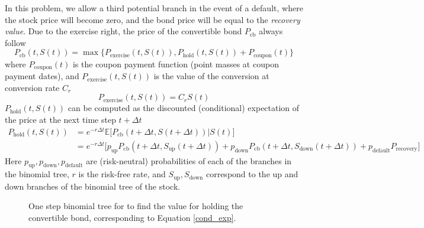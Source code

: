 \documentclass[11pt]{article}
\theoremstyle{definition}
\begin{document}
In this problem, we allow a third potential branch  
in the event of a default, where the stock price 
will become zero, and the bond price will be equal to 
the \emph{recovery value}.
Due to the exercise right,
the price of the convertible bond $P_\text{cb}$ 
always follow
%
\begin{equation}
\label{exercise}
  P_\text{cb}(t,S(t)) = \max\Big\{P_\text{exercise}(t,S(t)), 
                        P_\text{hold}(t,S(t)) + 
                        P_\text{coupon}(t)\Big\}
\end{equation}
%
where $P_\text{coupon}(t)$ is the coupon payment function
(point masses at coupon payment dates),
and $P_\text{exercise}(t,S(t))$ is the value of the conversion
at conversion rate $C_r$
%
\begin{equation*}
  P_\text{exercise}(t,S(t)) = C_r S(t)
\end{equation*}
%
$P_\text{hold}(t,S(t))$ can be computed as the 
discounted (conditional) expectation of 
the price at the next time step $t+\Delta t$
%
\begin{equation}
\label{cond_exp}
\begin{aligned}
  P_\text{hold}(t,S(t)) &= e^{-r\Delta t} 
    \mathbb{E}\Big[P_\text{cb}(t+\Delta t,S(t+\Delta t)) \Big| S(t)\Big] \\
  &= e^{-r\Delta t} \Big[p_\text{up} 
    P_\text{cb}(t+\Delta t,S_\text{up}(t+\Delta t)) + 
    p_\text{down} P_\text{cb}(t+\Delta t,S_\text{down}(t+\Delta t)) + 
    p_\text{default} P_\text{recovery} \Big]
\end{aligned}
\end{equation}
%
Here $p_\text{up}, p_\text{down}, p_\text{default}$
are (risk-neutral) probabilities of each of the branches
in the binomial tree, $r$ is the risk-free rate,
and $S_\text{up}, S_\text{down}$ correspond to 
the up and down branches of the binomial tree of the stock.

\begin{figure}[h]
\centering
{}
\caption{One step binomial tree for to find the value for
  holding the convertible bond,
  corresponding to Equation \eqref{cond_exp}.}
\end{figure}
\end{document}
